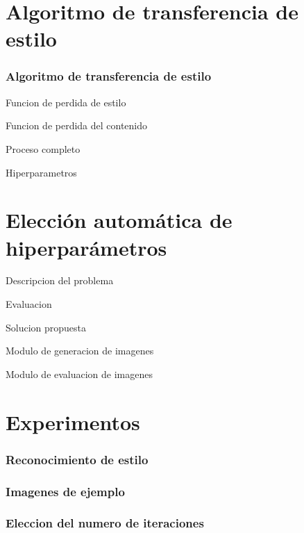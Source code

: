 \documentclass[12pt,center]{beamer}
\begin{document}
\section{Algoritmo de transferencia de estilo}
\begin{frame}
 \frametitle{Algoritmo de transferencia de estilo}
 Funcion de perdida de estilo
\end{frame}

\begin{frame}
 Funcion de perdida del contenido
\end{frame}

\begin{frame}
 Proceso completo
\end{frame}

\begin{frame}
Hiperparametros
\end{frame}


\section{Elección automática de hiperparámetros}
\begin{frame}
 Descripcion del problema
\end{frame}

\begin{frame}
 Evaluacion
\end{frame}

\begin{frame}
  Solucion propuesta
\end{frame}

\begin{frame}
  Modulo de generacion de imagenes
\end{frame}

\begin{frame}
  Modulo de evaluacion de imagenes
\end{frame}

\section{Experimentos}
\begin{frame}
  \frametitle{Reconocimiento de estilo}
\end{frame}

\begin{frame}
  \frametitle{Imagenes de ejemplo}
\end{frame}

\begin{frame}
  \frametitle{Eleccion del numero de iteraciones}
\end{frame}
\end{document}
